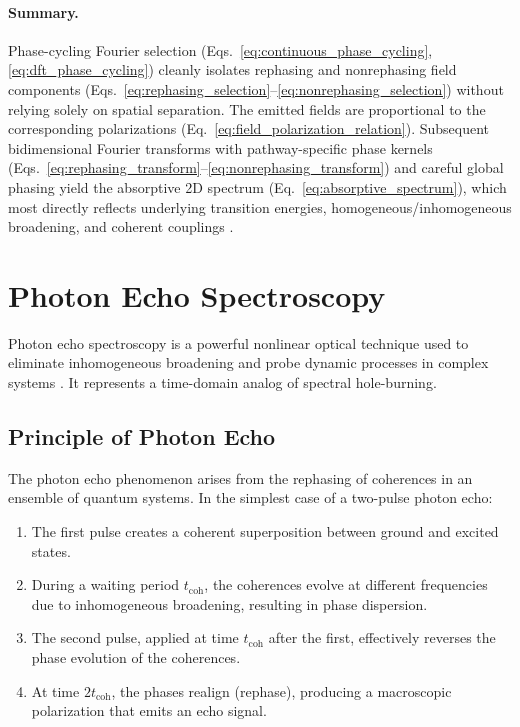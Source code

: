 \paragraph{Summary.}
\noindent Phase-cycling Fourier selection (Eqs.~\eqref{eq:continuous_phase_cycling}, \eqref{eq:dft_phase_cycling}) cleanly isolates rephasing and nonrephasing field components (Eqs.~\eqref{eq:rephasing_selection}--\eqref{eq:nonrephasing_selection}) without relying solely on spatial separation. The emitted fields are proportional to the corresponding polarizations (Eq.~\eqref{eq:field_polarization_relation}). Subsequent bidimensional Fourier transforms with pathway-specific phase kernels (Eqs.~\eqref{eq:rephasing_transform}--\eqref{eq:nonrephasing_transform}) and careful global phasing yield the absorptive 2D spectrum (Eq.~\eqref{eq:absorptive_spectrum}), which most directly reflects underlying transition energies, homogeneous/inhomogeneous broadening, and coherent couplings \cite{mukamel1995principlesnonlinearoptical, cho2009twodimensionalopticalspectroscopy, greenetal2024vibrationalcoherenceshalfbroadband}.


\section{Photon Echo Spectroscopy}
\label{sec:photon_echo}

\noindent Photon echo spectroscopy is a powerful nonlinear optical technique used to eliminate inhomogeneous broadening and probe dynamic processes in complex systems \cite{hybletal1998twodimensionalelectronicspectroscopy, mukamel1995principlesnonlinearoptical}. It represents a time-domain analog of spectral hole-burning.

\subsection{Principle of Photon Echo}
\label{subsec:echo_principle}

\noindent The photon echo phenomenon arises from the rephasing of coherences in an ensemble of quantum systems. In the simplest case of a two-pulse photon echo:

\begin{enumerate}
	\item The first pulse creates a coherent superposition between ground and excited states.
	\item During a waiting period $t_{\text{coh}}$, the coherences evolve at different frequencies due to inhomogeneous broadening, resulting in phase dispersion.
	\item The second pulse, applied at time $t_{\text{coh}}$ after the first, effectively reverses the phase evolution of the coherences.
	\item At time $2t_{\text{coh}}$, the phases realign (rephase), producing a macroscopic polarization that emits an echo signal.
\end{enumerate}

